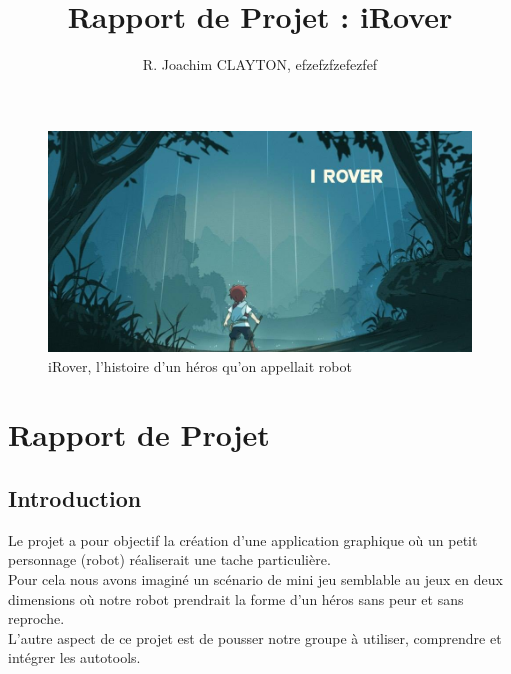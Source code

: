 \documentclass[a4paper 12pts]{article}
\title{Rapport de Projet : iRover}
\author{R. Joachim CLAYTON, efzefzfzefezfef}
\begin{document}
\maketitle


\begin{figure}[h]
   \includegraphics[width=350pt]{Illustration/proj_irover.jpg}
	\caption{iRover, l'histoire d'un héros qu'on appellait robot}
\end{figure}



\newpage


\renewcommand{\contentsname}{Sommaire} 
\tableofcontents

\newpage








\section{Rapport de Projet}


\vspace{2cm}



\subsection{Introduction}

\vspace{1 cm}


Le projet a pour objectif la création d'une application graphique où un petit personnage (robot) réaliserait une tache particulière.\\
Pour cela nous avons imaginé un scénario de mini jeu semblable au jeux en deux dimensions où notre robot prendrait la forme d'un héros sans peur et sans reproche.\\
L'autre aspect de ce projet est de pousser notre groupe à utiliser, comprendre et intégrer les autotools.
\vspace{1 cm}
\end{document}

